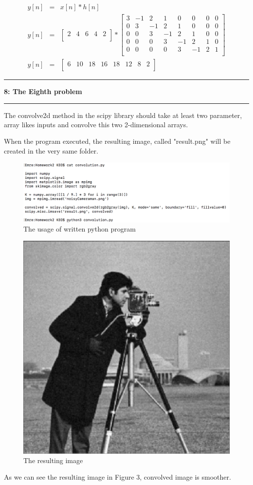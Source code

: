 \documentclass[11pt]{article}
\newcommand\question[2]{\vspace{.25in}\hrule\textbf{#1: #2}\vspace{.5em}\hrule\vspace{.10in}}
\begin{document}
\begin{eqnarray*}
	y[n] &=& x[n] * h[n] \\
	y[n] &=& 
		\begin{bmatrix}
			2 & 4 & 6 & 4 & 2 \\
		\end{bmatrix} *
		\begin{bmatrix}
			3 & -1 & 2 & 1 & 0 & 0 & 0 & 0 \\
			0 & 3 & -1 & 2 & 1 & 0 & 0 & 0 \\
			0 & 0 & 3 & -1 & 2 & 1 & 0 & 0\\
			0 & 0 & 0 & 3 & -1 & 2 & 1 & 0\\
			0 & 0 & 0 & 0 & 3 & -1 & 2 & 1\\
		\end{bmatrix} \\
	y[n] &=& 
		\begin{bmatrix}
			6 & 10 & 18 & 16 & 18 & 12 & 8 & 2 \\
		\end{bmatrix}
\end{eqnarray*}

\cleardoublepage

\question{8}{The Eighth problem}

The convolve2d method in the scipy library should take at least two parameter, array likes inputs and convolve this two 2-dimensional arrays.

When the program executed, the resulting image, called "result.png" will be created in the very same folder.

\begin{figure}[h]
	\centering
	\includegraphics[width=1\linewidth]{convolution}
	\caption{The usage of written python program }
	\label{fig:convolution}
\end{figure}

\begin{figure}[h]
	\centering
	\includegraphics[width=0.5\linewidth]{result}
	\caption{The resulting image }
	\label{fig:result}
\end{figure}

As we can see the resulting image in Figure 3, convolved image is smoother. 
\end{document}
